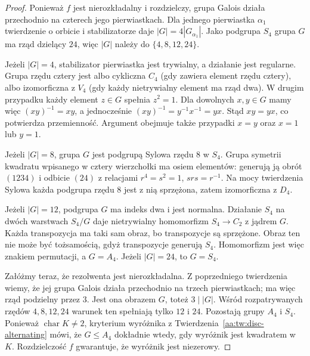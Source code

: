 \begin{proof}
Ponieważ $f$ jest nierozkładalny i rozdzielczy, grupa Galois
działa przechodnio na czterech jego pierwiastkach.
Dla jednego pierwiastka $\alpha_1$ twierdzenie o orbicie
i stabilizatorze daje $|G|=4|G_{\alpha_1}|$.
Jako podgrupa $S_4$ grupa $G$ ma rząd dzielący $24$,
więc $|G|$ należy do $\{4,8,12,24\}$.

Jeżeli $|G|=4$, stabilizator pierwiastka jest trywialny,
a działanie jest regularne. Grupa rzędu cztery jest albo
cykliczna $C_4$ (gdy zawiera element rzędu cztery), albo
izomorficzna z $V_4$ (gdy każdy nietrywialny element ma rząd dwa).
W drugim przypadku każdy element $z\in G$ spełnia $z^2=1$.
Dla dowolnych $x,y\in G$ mamy więc
$(xy)^{-1}=xy$, a jednocześnie $(xy)^{-1}=y^{-1}x^{-1}=yx$.
Stąd $xy=yx$, co potwierdza przemienność. Argument obejmuje
także przypadki $x=y$ oraz $x=1$ lub $y=1$.

Jeżeli $|G|=8$, grupa $G$ jest podgrupą Sylowa rzędu $8$
w $S_4$. Grupa symetrii kwadratu wpisanego w cztery wierzchołki
ma osiem elementów: generują ją obrót $(1234)$ i odbicie $(24)$
z relacjami $r^4=s^2=1$, $srs=r^{-1}$.
Na mocy twierdzenia Sylowa każda podgrupa rzędu $8$
jest z nią sprzężona, zatem izomorficzna z $D_4$.

Jeżeli $|G|=12$, podgrupa $G$ ma indeks dwa i jest normalna.
Działanie $S_4$ na dwóch warstwach $S_4/G$ daje
nietrywialny homomorfizm $S_4\to C_2$ z jądrem $G$.
Każda transpozycja ma taki sam obraz, bo transpozycje są sprzężone.
Obraz ten nie może być tożsamością, gdyż transpozycje generują
$S_4$. Homomorfizm jest więc znakiem permutacji, a $G=A_4$.
Jeżeli $|G|=24$, to $G=S_4$.

Załóżmy teraz, że rezolwenta jest nierozkładalna. Z poprzedniego
twierdzenia wiemy, że jej grupa Galois działa przechodnio
na trzech pierwiastkach; ma więc rząd podzielny przez $3$.
Jest ona obrazem $G$, toteż $3\mid |G|$.
Wśród rozpatrywanych rzędów $4,8,12,24$ warunek ten
spełniają tylko $12$ i $24$. Pozostają grupy $A_4$ i $S_4$.
Ponieważ $\operatorname{char}K\ne2$, kryterium wyróżnika
z Twierdzenia~\ref{aa:tw:disc-alternating} mówi, że
$G\le A_4$ dokładnie wtedy, gdy wyróżnik jest kwadratem w $K$.
Rozdzielczość $f$ gwarantuje, że wyróżnik jest niezerowy.
\end{proof}

